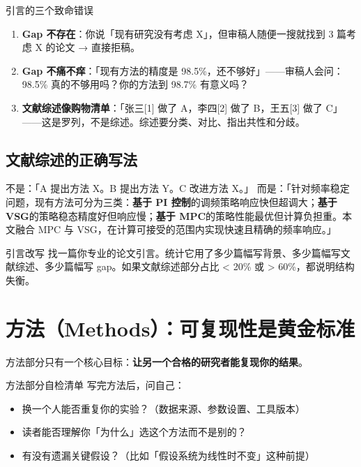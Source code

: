 \documentclass[12pt,a4paper]{ctexart}
\begin{document}
\begin{writingtip}{引言的三个致命错误}
    \begin{enumerate}
        \item \textbf{Gap 不存在}：你说「现有研究没有考虑 X」，但审稿人随便一搜就找到 3 篇考虑 X 的论文 → 直接拒稿。
        \item \textbf{Gap 不痛不痒}：「现有方法的精度是 98.5\%，还不够好」——审稿人会问：98.5\% 真的不够用吗？你的方法到 98.7\% 有意义吗？
        \item \textbf{文献综述像购物清单}：「张三[1] 做了 A，李四[2] 做了 B，王五[3] 做了 C」——这是罗列，不是综述。综述要分类、对比、指出共性和分歧。
    \end{enumerate}
\end{writingtip}

\subsection*{文献综述的正确写法}

不是：「A 提出方法 X。B 提出方法 Y。C 改进方法 X。」
而是：「针对频率稳定问题，现有方法可分为三类：\textbf{基于 PI 控制}的调频策略响应快但超调大；\textbf{基于 VSG}的策略稳态精度好但响应慢；\textbf{基于 MPC}的策略性能最优但计算负担重。本文融合 MPC 与 VSG，在计算可接受的范围内实现快速且精确的频率响应。」

\begin{exercise}{引言改写}
    找一篇你专业的论文引言。统计它用了多少篇幅写背景、多少篇幅写文献综述、多少篇幅写 gap。如果文献综述部分占比 < 20\% 或 > 60\%，都说明结构失衡。
\end{exercise}


\section{方法（Methods）：可复现性是黄金标准}

方法部分只有一个核心目标：\textbf{让另一个合格的研究者能复现你的结果}。

\begin{writingtip}{方法部分自检清单}
    写完方法后，问自己：
    \begin{itemize}
        \item 换一个人能否重复你的实验？（数据来源、参数设置、工具版本）
        \item 读者能否理解你「为什么」选这个方法而不是别的？
        \item 有没有遗漏关键假设？（比如「假设系统为线性时不变」这种前提）
    \end{itemize}
\end{writingtip}
\end{document}
